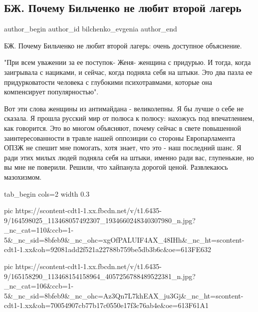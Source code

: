  
 
 
 
 
 
\subsection{БЖ. Почему Бильченко не любит второй лагерь}
\label{sec:24_03_2021.fb.bilchenko_evgenia.1.vtoroj_lager}
 
\ifcmt
 author_begin
   author_id bilchenko_evgenia
 author_end
\fi

БЖ. Почему Бильченко не любит второй лагерь: 
очень доступное объяснение.

"При всем уважении за ее поступок- Женя- женщина с придурью. И тогда, когда
заигрывала с нациками, и сейчас, когда подняла себя на штыки. Это два пазла ее
придурковатости человека с глубокими психотравмами, которые она компенсирует
популярностью". 

Вот эти слова женщины из антимайдана - великолепны. Я бы лучше о себе не
сказала. Я прошла русский мир от полюса к полюсу: нахожусь под впечатлением,
как говорится. Это во многом объясняют, почему сейчас в свете повышенной
заинтересованности в травле нашей оппозиции со стороны Европарламента ОПЗЖ не
спешит мне помогать, хотя знает, что это - наш последний шанс. Я ради этих
милых людей подняла себя на штыки, именно ради вас, глупенькие, но вы мне не
поверили. Решили, что хайпанула дорогой ценой. Развлекаюсь мазохизмом.

\ifcmt
  tab_begin cols=2
		width 0.3

     pic https://scontent-cdt1-1.xx.fbcdn.net/v/t1.6435-9/164598025_113468057492307_1934660248340307980_n.jpg?_nc_cat=110&ccb=1-5&_nc_sid=8bfeb9&_nc_ohc=xgOfPALUIF4AX_48IHh&_nc_ht=scontent-cdt1-1.xx&oh=92081add2f521a22788b759be5db3b6c&oe=613FE632

     pic https://scontent-cdt1-1.xx.fbcdn.net/v/t1.6435-9/165158290_113468154158964_4057256788489522381_n.jpg?_nc_cat=106&ccb=1-5&_nc_sid=8bfeb9&_nc_ohc=Az3Qn7L7khEAX_ju3Gj&_nc_ht=scontent-cdt1-1.xx&oh=70054907cb77b17c0550e17f3c76ab4e&oe=613F61A1

